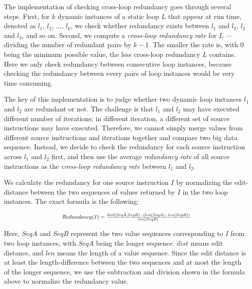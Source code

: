 The implementation of checking cross-loop redundancy goes through several
steps. First, for $k$ dynamic instances of a static loop $L$ that appear
at run time, denoted as $l_1$, $l_2$,
..., $l_k$, we check whether redundancy exists between $l_1$ and $l_2$, 
$l_2$ and $l_3$, and so on. Second, we compute a 
\textit{cross-loop redundancy rate} for $L$
--- dividing the number of redundant pairs by $k-1$.
The smaller the rate is, with 0 being the minimum possible value, the
less cross-loop redundancy $L$ contains.
Here we only check redundancy between consecutive loop instances, because  
checking the redundancy between every pairs of loop
instances would be very time consuming.

The key of this implementation is
to judge whether two dynamic loop instances $l_1$ and $l_2$ 
are redundant or not.
The challenge is that $l_1$ and $l_2$ may have executed different number of
iterations; in different iteration, a different set of source instructions
may have executed. Therefore, we cannot simply merge values from different
source instructions and iterations together and compare two big data sequence.
Instead, we decide to check the redundancy for each source instruction across
$l_1$ and $l_2$ first, and then use the average \textit{redundancy rate} of
all source instructions as the \textit{cross-loop redundancy rate} between
$l_1$ and $l_2$. 

We calculate the redundancy for one source instruction $I$ by normalizing the
edit-distance between the two sequences of values returned by $I$ in the two
loop instances. The exact formula is the following:


\[
\Scale[0.8]{
	Redundancy(I) =  \frac{dist(SeqA,SeqB) - (len(SeqA) - len(SeqB))}{len(SeqB)}
}
\]

Here, $SeqA$ and $SeqB$ represent the two value sequences corresponding to $I$
from two loop instances, with $SeqA$ being the longer sequence.
$dist$ means edit distance, and $len$ means the length of a value sequence.
Since the edit distance is at least the length-difference between the
two sequences and at most the length of the longer sequence, we use the 
subtraction and division shown in the formula above to normalize the
redundancy value.



